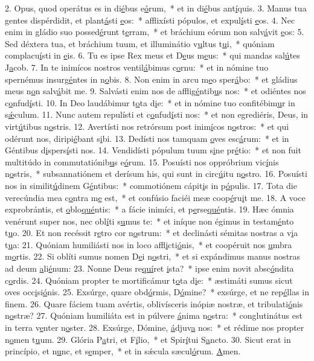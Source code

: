 2. Opus, quod operátus es in di\uline{é}bus e\uline{ó}rum,~* et in di\uline{é}bus ant\uline{í}quis.
3. Manus tua gentes dispérdidit, et plant\uline{á}sti \uline{e}os:~* afflixísti pópulos, et expul\uline{í}sti \uline{e}os.
4. Nec enim in gládio suo possed\uline{é}runt t\uline{e}rram,~* et bráchium eórum non salv\uline{á}vit \uline{e}os:
5. Sed déxtera tua, et bráchium tuum, et illuminátio v\uline{u}ltus t\uline{u}i,~* quóniam complacu\uline{í}sti in \uline{e}is.
6. Tu es ipse Rex meus et D\uline{e}us m\uline{e}us:~* qui mandas sal\uline{ú}tes J\uline{a}cob.
7. In te inimícos nostros ventil\uline{á}bimus c\uline{o}rnu:~* et in nómine tuo spernémus insurg\uline{é}ntes in n\uline{o}bis.
8. Non enim in arcu m\uline{e}o sper\uline{á}bo:~* et gládius meus n\uline{o}n salv\uline{á}bit me.
9. Salvásti enim nos de afflig\uline{é}ntib\uline{u}s nos:~* et odiéntes nos c\uline{o}nfud\uline{í}sti.
10. In Deo laudábimur t\uline{o}ta d\uline{i}e:~* et in nómine tuo confitébim\uline{u}r in s\uline{ǽ}culum.
11. Nunc autem repulísti et c\uline{o}nfud\uline{í}sti nos:~* et non egrediéris, Deus, in virt\uline{ú}tibus n\uline{o}stris.
12. Avertísti nos retrórsum post inim\uline{í}cos n\uline{o}stros:~* et qui odérunt nos, diripi\uline{é}bant s\uline{i}bi.
13. Dedísti nos tamquam \uline{o}ves esc\uline{á}rum:~* et in Géntibus d\uline{i}spers\uline{í}sti nos.
14. Vendidísti pópulum tuum s\uline{i}ne pr\uline{é}tio:~* et non fuit multitúdo in commutatiónib\uline{u}s e\uline{ó}rum.
15. Posuísti nos oppróbrium vic\uline{í}nis n\uline{o}stris,~* subsannatiónem et derísum his, qui sunt in circ\uline{ú}itu n\uline{o}stro.
16. Posuísti nos in similit\uline{ú}dinem G\uline{é}ntibus:~* commotiónem cápit\uline{i}s in p\uline{ó}pulis.
17. Tota die verecúndia mea c\uline{o}ntra m\uline{e} est,~* et confúsio faciéi meæ coop\uline{é}ru\uline{i}t me.
18. A voce exprobrántis, et \uline{o}blo\uline{qué}ntis:~* a fácie inimíci, et p\uline{e}rse\uline{qué}ntis.
19. Hæc ómnia venérunt super nos, nec obl\uline{í}ti s\uline{u}mus te:~* et iníque non égimus in testam\uline{é}nto t\uline{u}o.
20. Et non recéssit r\uline{e}tro cor n\uline{o}strum:~* et declinásti sémitas nostras a v\uline{i}a t\uline{u}a:
21. Quóniam humiliásti nos in loco affl\uline{i}cti\uline{ó}nis,~* et coopéruit nos \uline{u}mbra m\uline{o}rtis.
22. Si oblíti sumus nomen D\uline{e}i n\uline{o}stri,~* et si expándimus manus nostras ad deum \uline{a}li\uline{é}num:
23. Nonne Deus re\uline{quí}ret \uline{i}sta?~* ipse enim novit absc\uline{ó}ndita c\uline{o}rdis.
24. Quóniam propter te mortificámur t\uline{o}ta d\uline{i}e:~* æstimáti sumus sicut oves occ\uline{i}si\uline{ó}nis.
25. Exsúrge, quare obd\uline{ó}rmis, D\uline{ó}mine?~* exsúrge, et ne rep\uline{é}llas in f\uline{i}nem.
26. Quare fáciem tuam avértis, oblivísceris inópiæ nostræ, et tribulati\uline{ó}nis n\uline{o}stræ?
27. Quóniam humiliáta est in púlvere \uline{á}nima n\uline{o}stra:~* conglutinátus est in terra v\uline{e}nter n\uline{o}ster.
28. Exsúrge, Dómine, \uline{á}djuv\uline{a} nos:~* et rédime nos propter n\uline{o}men t\uline{u}um.
29. Glória P\uline{a}tri, et F\uline{í}lio,~* et Spir\uline{í}tui S\uline{a}ncto.
30. Sicut erat in princípio, et n\uline{u}nc, et s\uline{e}mper,~* et in sǽcula sæcul\uline{ó}rum. \uline{A}men.
